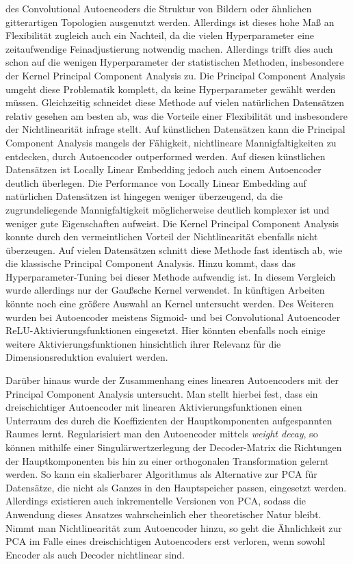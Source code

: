 des Convolutional Autoencoders die Struktur von Bildern oder ähnlichen gitterartigen Topologien
ausgenutzt werden. Allerdings ist dieses hohe Maß an Flexibilität zugleich auch ein Nachteil, da
die vielen Hyperparameter eine zeitaufwendige Feinadjustierung notwendig machen. Allerdings trifft
dies auch schon auf die wenigen Hyperparameter der statistischen Methoden, insbesondere der Kernel
Principal Component Analysis zu. Die Principal Component Analysis umgeht diese Problematik
komplett, da keine Hyperparameter gewählt werden müssen. Gleichzeitig schneidet diese Methode auf
vielen natürlichen Datensätzen relativ gesehen am besten ab, was die Vorteile einer Flexibilität
und insbesondere der Nichtlinearität infrage stellt. Auf künstlichen Datensätzen kann die Principal
Component Analysis mangels der Fähigkeit, nichtlineare Mannigfaltigkeiten zu entdecken, durch
Autoencoder outperformed werden. Auf diesen künstlichen Datensätzen ist Locally Linear Embedding
jedoch auch einem Autoencoder deutlich überlegen. Die Performance von Locally Linear Embedding auf
natürlichen Datensätzen ist hingegen weniger überzeugend, da die zugrundeliegende Mannigfaltigkeit
möglicherweise deutlich komplexer ist und weniger gute Eigenschaften aufweist. Die Kernel Principal
Component Analysis konnte durch den vermeintlichen Vorteil der Nichtlinearität ebenfalls nicht
überzeugen. Auf vielen Datensätzen schnitt diese Methode fast identisch ab, wie die klassische
Principal Component Analysis. Hinzu kommt, dass das Hyperparameter-Tuning bei dieser Methode
aufwendig ist. In diesem Vergleich wurde allerdings nur der Gaußsche Kernel verwendet. In künftigen
Arbeiten könnte noch eine größere Auswahl an Kernel untersucht werden. Des Weiteren wurden bei
Autoencoder meistens Sigmoid- und bei Convolutional Autoencoder ReLU-Aktivierungsfunktionen
eingesetzt. Hier könnten ebenfalls noch einige weitere Aktivierungsfunktionen hinsichtlich ihrer
Relevanz für die Dimensionsreduktion evaluiert werden.

Darüber hinaus wurde der Zusammenhang eines linearen Autoencoders mit der Principal Component
Analysis untersucht. Man stellt hierbei fest, dass ein dreischichtiger Autoencoder mit linearen
Aktivierungsfunktionen einen Unterraum des durch die Koeffizienten der Hauptkomponenten
aufgespannten Raumes lernt. Regularisiert man den Autoencoder mittels \textit{weight decay}, so
können mithilfe einer Singulärwertzerlegung der Decoder-Matrix die Richtungen der Hauptkomponenten
bis hin zu einer orthogonalen Transformation gelernt werden. So kann ein skalierbarer Algorithmus
als Alternative zur PCA für Datensätze, die nicht als Ganzes in den Hauptspeicher passen,
eingesetzt werden. Allerdings existieren auch inkrementelle Versionen von PCA, sodass die Anwendung
dieses Ansatzes wahrscheinlich eher theoretischer Natur bleibt. Nimmt man Nichtlinearität zum
Autoencoder hinzu, so geht die Ähnlichkeit zur PCA im Falle eines dreischichtigen Autoencoders erst
verloren, wenn sowohl Encoder als auch Decoder nichtlinear sind.

